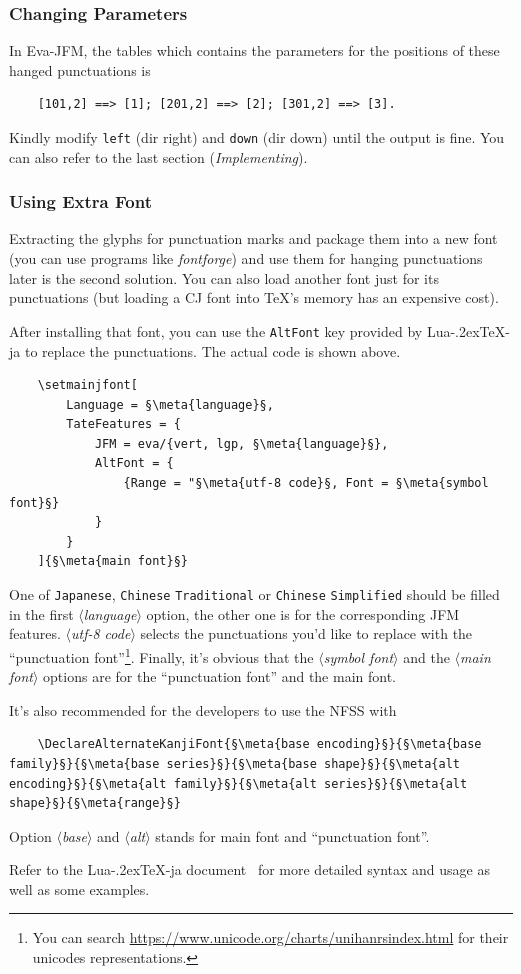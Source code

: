 \documentclass[twoside]{article}
\def\meta#1{{\normalfont\rmfamily\itshape$\langle$#1\/$\rangle$}}
\def\LuaTeX{Lua\kern-.2ex\TeX}
\begin{document}
\subsubsection{Changing Parameters}
In \textsf{Eva-JFM}, the tables which contains the parameters for the positions of these hanged punctuations is
\begin{lstlisting}
    [101,2] ==> [1]; [201,2] ==> [2]; [301,2] ==> [3].
\end{lstlisting}
Kindly modify \texttt{left} (dir right) and \texttt{down} (dir down) until the output is fine.
You can also refer to the last section (\textit{Implementing\/}).

\subsubsection{Using Extra Font}
Extracting the glyphs for punctuation marks and package them into a new font (you can use programs like \textit{fontforge\/}) and use them for hanging punctuations later is the second solution. You can also load another font just for its punctuations (but loading a CJ font into {\TeX}'s memory has an expensive cost).\par
After installing that font, you can use the \texttt{AltFont} key provided by \LuaTeX-ja to replace the punctuations. The actual code is shown above.
\begin{lstlisting}
    \setmainjfont[
        Language = §\meta{language}§,
        TateFeatures = {
            JFM = eva/{vert, lgp, §\meta{language}§},
            AltFont = {
                {Range = "§\meta{utf-8 code}§, Font = §\meta{symbol font}§}
            }
        }
    ]{§\meta{main font}§}
\end{lstlisting}
One of \texttt{Japanese}, \texttt{Chinese} \texttt{Traditional} or \texttt{Chinese} \texttt{Simplified} should be filled in the first \meta{language} option, the other one is for the corresponding JFM features. \meta{utf-8 code} selects the punctuations you'd like to replace with the ``punctuation font''\footnote{You can search \url{https://www.unicode.org/charts/unihanrsindex.html} for their unicodes representations.}.
Finally, it's obvious that the \meta{symbol font} and the \meta{main font} options are for the ``punctuation font'' and the main font.\par
It's also recommended for the developers to use the NFSS with
\begin{lstlisting}
    \DeclareAlternateKanjiFont{§\meta{base encoding}§}{§\meta{base family}§}{§\meta{base series}§}{§\meta{base shape}§}{§\meta{alt encoding}§}{§\meta{alt family}§}{§\meta{alt series}§}{§\meta{alt shape}§}{§\meta{range}§}
\end{lstlisting}
Option \meta{base} and \meta{alt} stands for main font and ``punctuation font''.\par
Refer to the \LuaTeX-ja document~\cite{luatexja-doc} for more detailed syntax and usage as well as some examples.
\end{document}
